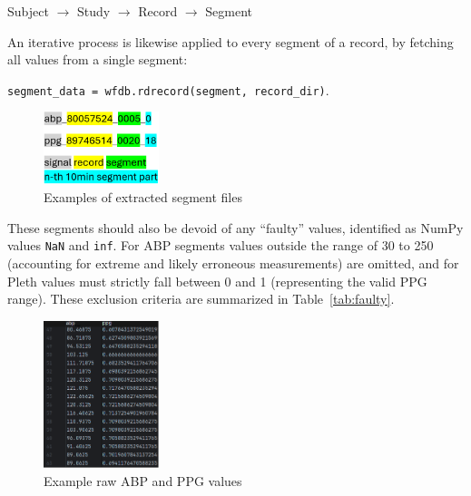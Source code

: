 \vspace{0.1cm}
{\centering Subject $\rightarrow$ Study $\rightarrow$ Record $\rightarrow$ Segment\par}
\vspace{0.1cm}

An iterative process is likewise applied to every segment of a record, by fetching all values from a single segment:

\vspace{0.1cm}
{\centering \texttt{segment\_data = wfdb.rdrecord(segment, record\_dir)}.\par}
\vspace{0.1cm}

\begin{figure}
    \vspace{-0.5cm}
    \begin{center}
        \includegraphics[width=0.3\textwidth]{images/methods/segments}
    \end{center}
    \vspace*{-7mm}
    \captionsetup{format=plain, justification=centering, font=small}
    \caption{Examples of extracted segment files}
    \label{fig:segments}
\end{figure}

\noindent These segments should also be devoid of any \enquote{faulty} values, identified as NumPy values \texttt{NaN} and \texttt{inf}.
For ABP segments values outside the range of 30 to 250 (accounting for extreme and likely erroneous measurements) are omitted, and for Pleth values must strictly fall between 0 and 1 (representing the valid PPG range).
These exclusion criteria are summarized in Table~\ref{tab:faulty}.

\begin{figure}
    \vspace{-1cm}
    \begin{center}
        \includegraphics[width=0.3\textwidth]{images/methods/values}
    \end{center}
    \vspace*{-7mm}
    \captionsetup{format=plain, justification=centering}
    \caption{\small Example raw ABP and PPG values}
    \label{fig:values}
\end{figure}

